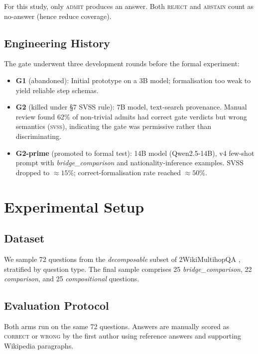 \documentclass[11pt]{article}
\newcommand{\svss}{\textsc{svss}}
\begin{document}
For this study, only \textsc{admit} produces an answer.
Both \textsc{reject} and \textsc{abstain} count as no-answer (hence reduce
coverage).

\subsection{Engineering History}

The gate underwent three development rounds before the formal experiment:

\begin{itemize}[leftmargin=*,noitemsep]
  \item \textbf{G1} (abandoned): Initial prototype on a 3B model; formalisation
    too weak to yield reliable step schemas.
  \item \textbf{G2} (killed under §7 SVSS rule): 7B model, text-search
    provenance.  Manual review found 62\% of non-trivial admits had
    correct gate verdicts but wrong semantics (\svss{}), indicating the gate
    was permissive rather than discriminating.
  \item \textbf{G2-prime} (promoted to formal test): 14B model (Qwen2.5-14B),
    v4 few-shot prompt with \emph{bridge\_comparison} and nationality-inference
    examples.  SVSS dropped to $\approx\!15\%$; correct-formalisation rate
    reached $\approx\!50\%$.
\end{itemize}

\section{Experimental Setup}
\label{sec:setup}

\subsection{Dataset}

We sample 72 questions from the \emph{decomposable} subset of
2WikiMultihopQA \citep{2wikimultihopqa}, stratified by question type.
The final sample comprises 25 \emph{bridge\_comparison}, 22
\emph{comparison}, and 25 \emph{compositional} questions.

\subsection{Evaluation Protocol}

Both arms run on the same 72 questions.  Answers are manually scored as
\textsc{correct} or \textsc{wrong} by the first author using reference
answers and supporting Wikipedia paragraphs.
\end{document}
